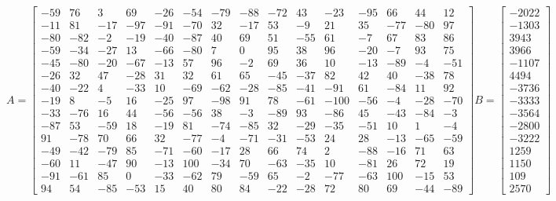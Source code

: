 \documentclass[a4paper, 12pt]{article}
\begin{document}
\scriptsize
\[
A = 
\left[{
	\begin{array}{rrrrrrrrrrrrrrr}
	-59  &   76  &    3  &   69  &  -26  &  -54  &  -79  &  -88  &  -72  &   43  &  -23  &  -95  &   66  &   44  &   12	\\
	-11  &   81  &  -17  &  -97  &  -91  &  -70  &   32  &  -17  &   53  &   -9  &   21  &   35  &  -77  &  -80  &   97	\\
	-80  &  -82  &   -2  &  -19  &  -40  &  -87  &   40  &   69  &   51  &  -55  &   61  &   -7  &   67  &   83  &   86 \\
	-59  &  -34  &  -27  &   13  &  -66  &  -80  &    7  &    0  &   95  &   38  &   96  &  -20  &   -7  &   93  &   75	\\
	-45  &  -80  &  -20  &  -67  &  -13  &   57  &   96  &   -2  &   69  &   36  &   10  &  -13  &  -89  &   -4  &  -51	\\
	-26  &   32  &   47  &  -28  &   31  &   32  &   61  &   65  &  -45  &  -37  &   82  &   42  &   40  &  -38  &   78 \\
	-40  &  -22  &    4  &  -33  &   10  &  -69  &  -62  &  -28  &  -85  &  -41  &  -91  &   61  &  -84  &   11  &   92	\\
	-19  &    8  &   -5  &   16  &  -25  &   97  &  -98  &   91  &   78  &  -61  & -100  &  -56  &   -4  &  -28  &  -70	\\
	-33  &  -76  &   16  &   44  &  -56  &  -56  &   38  &   -3  &  -89  &   93  &  -86  &   45  &  -43  &  -84  &   -3 \\
	-87  &   53  &  -59  &   18  &  -19  &   81  &  -74  &  -85  &   32  &  -29  &  -35  &  -51  &   10  &    1  &   -4 \\
	 91  &  -78  &   70  &   66  &   32  &  -77  &   -4  &  -71  &  -31  &  -53  &   24  &   28  &  -13  &  -65  &  -59	\\
	-49  &  -42  &  -79  &   85  &  -71  &  -60  &  -17  &   28  &   66  &   74  &    2  &  -88  &  -16  &   71  &   63	\\
	-60  &   11  &  -47  &   90  &  -13  &  100  &  -34  &   70  &  -63  &  -35  &   10  &  -81  &   26  &   72  &   19	\\
	-91  &  -61  &   85  &    0  &  -33  &  -62  &   79  &  -59  &   65  &   -2  &  -77  &  -63  &  100  &  -15  &   53	\\
	 94  &   54  &  -85  &  -53  &   15  &   40  &   80  &   84  &  -22  &  -28  &   72  &   80  &   69  &  -44  &  -89
	\end{array} 
}\right]
B = 
\left[{
	\begin{array}{r}
	-2022 \\
	-1303 \\
	3943 \\
	3966 \\
	-1107 \\
	4494 \\
	-3736 \\
	-3333 \\
	-3564 \\
	-2800 \\
	-3222 \\
	1259 \\
	1150 \\
	109 \\
	2570 
	\end{array}
}\right]
\]
\end{document}
